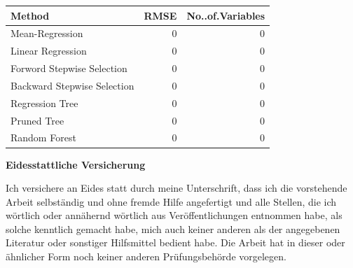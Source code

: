 \documentclass[11pt,]{article}
\begin{document}
\begin{tabular}{l|r|r}
\hline
Method & RMSE & No..of.Variables\\
\hline
Mean-Regression & 0 & 0\\
\hline
Linear Regression & 0 & 0\\
\hline
Forword Stepwise Selection & 0 & 0\\
\hline
Backward Stepwise Selection & 0 & 0\\
\hline
Regression Tree & 0 & 0\\
\hline
Pruned Tree & 0 & 0\\
\hline
Random Forest & 0 & 0\\
\hline
\end{tabular}
\renewcommand*{\mkbibnamefamily}[1]{\textbf{#1}}
\renewcommand*{\mkbibnamegiven}[1]{\textbf{#1}}
\renewcommand*{\mkbibnameprefix}[1]{\textbf{#1}}
\renewcommand*{\mkbibnamesuffix}[1]{\textbf{#1}}
\printbibliography[title=References]

\newpage
\textbf{Eidesstattliche Versicherung}

\bigskip

Ich versichere an Eides statt durch meine Unterschrift, dass ich die vorstehende Arbeit selbständig und ohne fremde Hilfe angefertigt und alle Stellen, die ich wörtlich oder annähernd wörtlich aus Veröffentlichungen entnommen habe, als solche kenntlich gemacht habe, mich auch keiner anderen als der angegebenen Literatur oder sonstiger Hilfsmittel bedient habe. Die Arbeit hat in dieser oder ähnlicher Form noch keiner anderen Prüfungsbehörde vorgelegen.

\vspace{1cm}
\rule{0pt}{2\baselineskip} %
\par\noindent{} \hfill\makebox[2.25in]{\hrulefill}%
\par\noindent\makebox[2.25in][l]{} \hfill{}%
\end{document}
